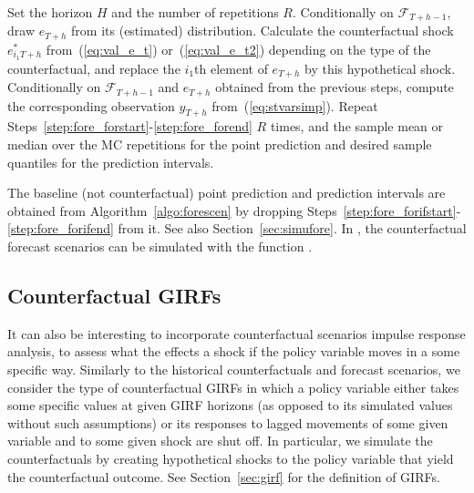\documentclass[nojss]{jss}
\begin{document}
\begin{algorithm}[!ht]
\caption{Counterfactual forecast scenario}
\begin{algorithmic}[1]\label{algo:forescen}
  \STATE Set the horizon $H$ and the number of repetitions $R$.
  \label{step:fore_forstart}
    \STATE Conditionally on $\mathcal{F}_{T+h-1}$, draw $e_{T+h}$ from its (estimated) distribution.
    \label{step:fore_forifstart}
      \STATE Calculate the counterfactual shock $e_{i_1T+h}^*$ from~(\ref{eq:val_e_t}) or~(\ref{eq:val_e_t2}) depending on the type of the counterfactual, and replace the $i_1$th element of $e_{T+h}$ by this hypothetical shock.\label{step:fore_count_shock}
    \ENDIF\label{step:fore_forifend}
  \STATE Conditionally on $\mathcal{F}_{T+h-1}$ and $e_{T+h}$ obtained from the previous steps, compute the corresponding observation $y_{T+h}$ from~(\ref{eq:stvarsimp}).
  \ENDFOR\label{step:fore_forend}
  \STATE Repeat Steps~\ref{step:fore_forstart}-\ref{step:fore_forend} $R$ times, and the sample mean or median over the MC repetitions for the point prediction and desired sample quantiles for the prediction intervals.
\end{algorithmic}
\end{algorithm}

The baseline (not counterfactual) point prediction and prediction intervals are obtained from Algorithm~\ref{algo:forescen} by dropping Steps~\ref{step:fore_forifstart}-\ref{step:fore_forifend} from it. See also Section~\ref{sec:simufore}. In , the counterfactual forecast scenarios can be simulated with the function .


\subsection{Counterfactual GIRFs}\label{sec:countgirf}

It can also be interesting to incorporate counterfactual scenarios impulse response analysis, to assess what the effects a shock if the policy variable moves in a some specific way. Similarly to the historical counterfactuals and forecast scenarios, we consider the type of counterfactual GIRFs in which a policy variable either takes some specific values at given GIRF horizons (as opposed to its simulated values without such assumptions) or its responses to lagged movements of some given variable and to some given shock are shut off. In particular, we simulate the counterfactuals by creating hypothetical shocks to the policy variable that yield the counterfactual outcome. See Section~\ref{sec:girf} for the definition of GIRFs.
\end{document}
